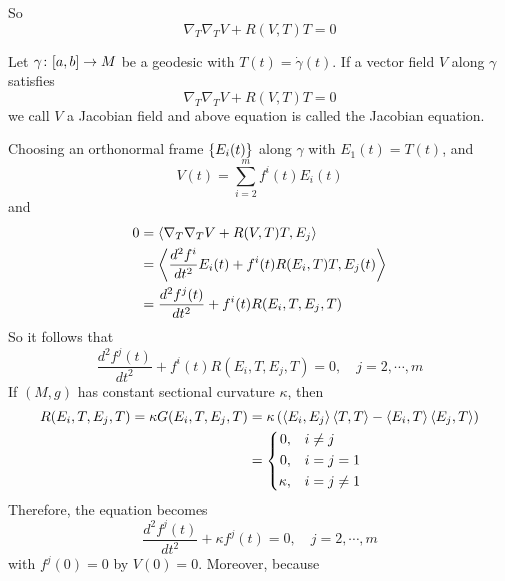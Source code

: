 \begin{enumerate}[label=\Roman{*}.]
\begin{equation*}
	\end{equation*}
	So
	\begin{equation*}
		\nabla_T\nabla_TV +R(V,T)T = 0
	\end{equation*}
	\begin{defn}
		Let $\gamma \colon [a,b] \rightarrow M$ be a geodesic with $T(t) =\dot{\gamma}(t)$. If a vector field $V$ along $\gamma$ satisfies
		\begin{equation*}
			\nabla_T\nabla_TV +R(V,T)T = 0
		\end{equation*}
		we call $V$ a Jacobian field and above equation is called the Jacobian equation.
	\end{defn}
	Choosing an orthonormal frame $\left\{E_i(t)\right\}$ along $\gamma$ with $E_1(t) = T(t)$, and
	\begin{equation*}
		V(t) = \sum_{i=2}^mf^i(t)E_i(t)
	\end{equation*}
	and
	\begin{equation*}
		\begin{aligned}
			0 &= \left\langle \nabla_T\nabla_TV +R(V,T)T,E_j \right\rangle \\
			&= \left\langle \frac{d^2f^i}{dt^2}E_i(t) + f^i(t)R(E_i,T)T,E_j(t) \right\rangle \\
			&= \frac{d^2f^j(t)}{dt^2} + f^i(t)R(E_i,T,E_j,T)
		\end{aligned}
	\end{equation*}
	So it follows that
	\begin{equation*}
		\frac{d^2f^j(t)}{dt^2} + f^i(t)R(E_i,T,E_j,T) = 0,\quad j = 2,\cdots,m
	\end{equation*}
	If $(M,g)$ has constant sectional curvature $\kappa$, then
	\begin{equation*}
		\begin{aligned}
			R(E_i,T,E_j,T) = \kappa G(E_i,T,E_j,T) &= \kappa \left(\left\langle E_i,E_j \right\rangle\left\langle T,T \right\rangle - \left\langle E_i,T \right\rangle\left\langle E_j,T \right\rangle\right)\\
			&= \left\{
				\begin{aligned}
					0,&\quad i\neq j \\
					0,&\quad i=j = 1 \\ 
					\kappa,&\quad i=j \neq 1
				\end{aligned}
			\right.
		\end{aligned}
	\end{equation*}
	Therefore, the equation becomes
	\begin{equation*}
		\frac{d^2f^j(t)}{dt^2} + \kappa f^j(t) = 0,\quad j = 2,\cdots,m
	\end{equation*}
	with $f^j(0) = 0$ by $V(0) = 0$. Moreover, because

\end{enumerate}
